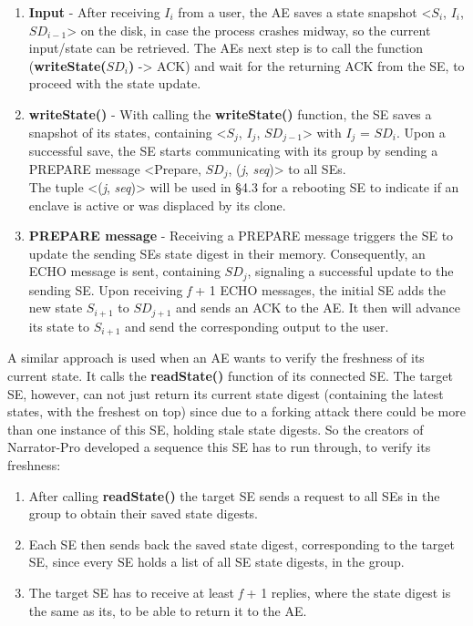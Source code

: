 \begin{enumerate}
    \item \textbf{Input} - After receiving \(I_i\) from a user, the AE saves a state snapshot <\(S_i\), \(I_i\), \(SD_{i-1}\)> on the disk, in case the process crashes midway, so the current input/state can be retrieved. The AEs next step is to call the function (\textbf{writeState(\(SD_i\))} -> ACK) and wait for the returning ACK from the SE, to proceed with the state update.
    \item \textbf{writeState()} - With calling the \textbf{writeState()} function, the SE saves a snapshot of its states, containing <\(S_j\), \(I_j\), \(SD_{j-1}\)> with \(I_j\) = \(SD_{i}\). Upon a successful save, the SE starts communicating with its group by sending a PREPARE message <Prepare, \(SD_{j}\), (\textit{j}, \textit{seq})> to all SEs.\\
    The tuple <(\textit{j}, \textit{seq})> will be used in §4.3 for a rebooting SE to indicate if an enclave is active or was displaced by its clone.
    \item \textbf{PREPARE message} - Receiving a PREPARE message triggers the SE to update the sending SEs state digest in their memory. Consequently, an ECHO message is sent, containing \(SD_{j}\), signaling a successful update to the sending SE. Upon receiving \textit{f} + 1 ECHO messages, the initial SE adds the new state \(S_{i+1}\) to \(SD_{j+1}\) and sends an ACK to the AE. It then will advance its state to \(S_{i+1}\) and send the corresponding output to the user.
\end{enumerate}

A similar approach is used when an AE wants to verify the freshness of its current state. It calls the \textbf{readState()} function of its connected SE. The target SE, however, can not just return its current state digest (containing the latest states, with the freshest on top)
since due to a forking attack there could be more than one instance of this SE, holding stale state digests. So the creators of Narrator-Pro developed a sequence this SE has to run through, to verify its freshness:
\begin{enumerate}
    \item After calling \textbf{readState()} the target SE sends a request to all SEs in the group to obtain their saved state digests.
    \item Each SE then sends back the saved state digest, corresponding to the target SE, since every SE holds a list of all SE state digests, in the group.
    \item The target SE has to receive at least \textit{f} + 1 replies, where the state digest is the same as its, to be able to return it to the AE. 
\end{enumerate}


